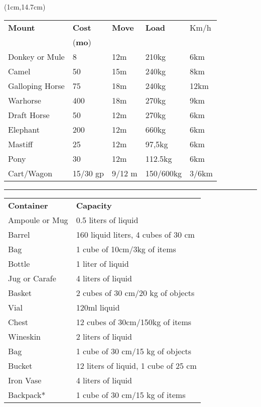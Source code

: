 \documentclass[a4paper,12 pt,openany]{book}
\newcommand{\linex}{\rule{\textwidth}{0.4pt}}
\begin{document}
\begin{textblock*}{12cm}(1cm,14.7cm) %

\begin{tabular}{lllll}
\hline
\textbf{Mount}&\textbf{Cost}&\textbf{Move}&\textbf{Load}&Km/h\\
&(\textbf{mo})&&&\\
Donkey or Mule&8&12m&210kg&6km\\
Camel&50&15m&240kg&8km\\
Galloping Horse&75&18m&240kg&12km\\
Warhorse&400&18m&270kg&9km\\
Draft Horse&50&12m&270kg&6km\\
Elephant&200&12m&660kg&6km\\
Mastiff&25&12m&97,5kg&6km\\
Pony&30&12m&112.5kg&6km\\
Cart/Wagon & 15/30 gp & 9/12 m &150/600kg & 3/6km \\
\end{tabular}

\linex

\begin{tabular}{ll}

\textbf{Container}&\textbf{Capacity}\\
Ampoule or Mug&0.5 liters of liquid\\
Barrel& 160 liquid liters, 4 cubes of 30 cm\\
Bag& 1 cube of 10cm/3kg of items\\
Bottle& 1 liter of liquid\\
Jug or Carafe&4 liters of liquid\\
Basket& 2 cubes of 30 cm/20 kg of objects\\
Vial & 120ml liquid\\
Chest& 12 cubes of 30cm/150kg of items\\
Wineskin & 2 liters of liquid\\
Bag& 1 cube of 30 cm/15 kg of objects\\
Bucket & 12 liters of liquid, 1 cube of 25 cm\\
Iron Vase & 4 liters of liquid\\
Backpack*& 1 cube of 30 cm/15 kg of items\\
\end{tabular}

\end{textblock*}
\end{document}
